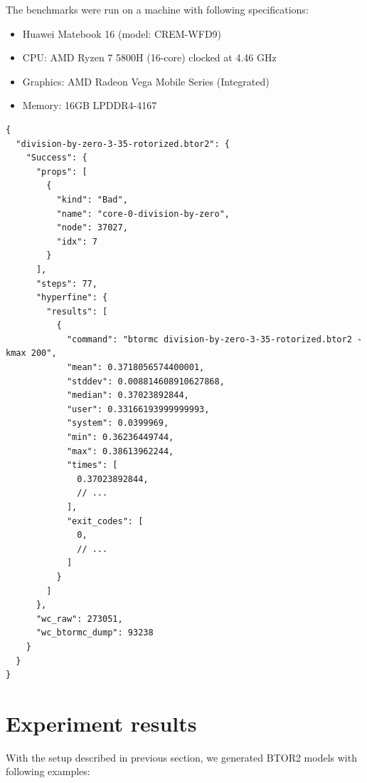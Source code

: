 \documentclass[12pt]{article}
\begin{document}
The benchmarks were run on a machine with following specifications: 
\begin{itemize}
    \item Huawei Matebook 16 (model: CREM-WFD9)
    \item CPU: AMD Ryzen 7 5800H (16-core) clocked at 4.46 GHz
    \item Graphics: AMD Radeon Vega Mobile Series (Integrated)
    \item Memory: 16GB LPDDR4-4167
\end{itemize}
\newpage
\begin{lstlisting}[label=lst:results_file, caption={Example of \texttt{peRISCope} results file}, captionpos=b]
{
  "division-by-zero-3-35-rotorized.btor2": {
    "Success": {
      "props": [
        {
          "kind": "Bad",
          "name": "core-0-division-by-zero",
          "node": 37027,
          "idx": 7
        }
      ],
      "steps": 77,
      "hyperfine": {
        "results": [
          {
            "command": "btormc division-by-zero-3-35-rotorized.btor2 -kmax 200",
            "mean": 0.3718056574400001,
            "stddev": 0.008814608910627868,
            "median": 0.37023892844,
            "user": 0.33166193999999993,
            "system": 0.0399969,
            "min": 0.36236449744,
            "max": 0.38613962244,
            "times": [
              0.37023892844,
              // ...
            ],
            "exit_codes": [
              0,
              // ...
            ]
          }
        ]
      },
      "wc_raw": 273051,
      "wc_btormc_dump": 93238
    }
  }
}
\end{lstlisting}
\newpage

\section{Experiment results}

With the setup described in previous section, we generated BTOR2 models with 
following examples: 
\end{document}
